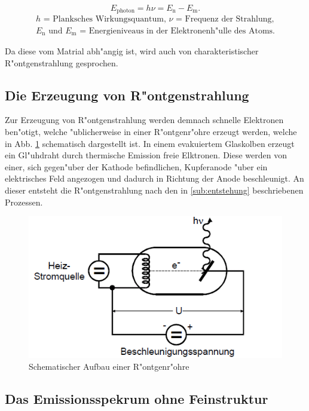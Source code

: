 		\begin{equation}
			E_{\text{photon}} = h \nu = E_\mathrm{n} - E_\mathrm{m}. \label{gleich_1}
		\end{equation}
		\begin{eqnarray*}
			\text{$h$ = Planksches Wirkungsquantum, $\nu$ = Frequenz der Strahlung,}\\
			\text{$E_\mathrm{n}$ und $E_\mathrm{m}$ = Energieniveaus in der Elektronenh"ulle des Atoms.}
		\end{eqnarray*}
	
		{Da diese vom Matrial abh"angig ist, wird auch von charakteristischer R"ontgenstrahlung gesprochen.}
		
	\subsection{Die Erzeugung von R"ontgenstrahlung}
	\label{sub:erzeugung}

		Zur Erzeugung von R"ontgenstrahlung werden demnach schnelle Elektronen ben"otigt, welche "ublicherweise in einer R"ontgenr"ohre erzeugt werden, welche in Abb. \ref{roentgenroehre} schematisch dargestellt ist.
		In einem evakuiertem Glaskolben erzeugt ein Gl"uhdraht durch thermische Emission freie Elktronen. 
		Diese werden von einer, sich gegen"uber der Kathode befindlichen, Kupferanode "uber ein elektrisches Feld angezogen und dadurch in Richtung der Anode beschleunigt.
		An dieser entsteht die R"ontgenstrahlung nach den in \ref{sub:entstehung} beschriebenen Prozessen.

		\begin{figure}[htbp]
			\centering
			\includegraphics[width = 12cm]{img/Roentgenroehre.png}
			\caption{Schematischer Aufbau einer R"ontgenr"ohre}
			\label{roentgenroehre}
		\end{figure}

	\subsection{Das Emissionsspekrum ohne Feinstruktur}
	\label{sub:ohnefein}

